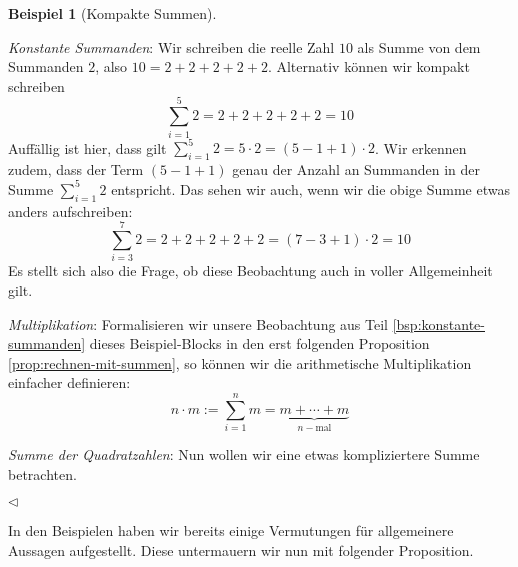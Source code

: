 \documentclass[11pt,reqno, a4paper]{book}
\theoremstyle{mystyle}
\theoremstyle{definition}
\newtheorem{exampleth}[theorem]{Beispiel}
\newenvironment{example}{\begin{exampleth}}{\hspace{\fill}$\triangleleft$\end{exampleth}}
\numberwithin{equation}{chapter}
\begin{document}
\begin{example}[Kompakte Summen]
    \begin{thmenum}
        \item \label{bsp:konstante-summanden} \textit{Konstante Summanden}: Wir schreiben die reelle Zahl \(10\) als Summe von dem Summanden \(2\), also \(10 = 2+2+2+2+2\). Alternativ können wir kompakt schreiben 
        \begin{equation*}
            \sum_{i=1}^5 2 = 2 + 2+ 2+ 2+ 2 = 10
        \end{equation*}
        Auffällig ist hier, dass gilt \(\sum_{i=1}^5 2 = 5\cdot 2 = (5 - 1 + 1) \cdot 2 \). Wir erkennen zudem, dass der Term \((5-1+1)\) genau der Anzahl an Summanden in der Summe \(\sum_{i=1}^5 2\) entspricht. Das sehen wir auch, wenn wir die obige Summe etwas anders aufschreiben: 
        \begin{equation*}
            \sum_{i=3}^7 2 = 2 + 2 + 2 + 2 + 2 = (7-3+1)\cdot 2 = 10
        \end{equation*}
        Es stellt sich also die Frage, ob diese Beobachtung auch in voller Allgemeinheit gilt. 
        
        \item \textit{Multiplikation}: Formalisieren wir unsere Beobachtung aus Teil \ref{bsp:konstante-summanden} dieses Beispiel-Blocks in den erst folgenden Proposition \ref{prop:rechnen-mit-summen}, so können wir die arithmetische Multiplikation einfacher definieren:
        \begin{equation*}
            n\cdot m := \sum_{i=1}^n m = \underbrace{m+\cdots +m}_{n-\text{mal}}
        \end{equation*}

        \item \textit{Summe der Quadratzahlen}: Nun wollen wir eine etwas kompliziertere Summe betrachten. 
    \end{thmenum}
\end{example}
In den Beispielen haben wir bereits einige Vermutungen für allgemeinere Aussagen aufgestellt. Diese untermauern wir nun mit folgender Proposition. 
\end{document}
